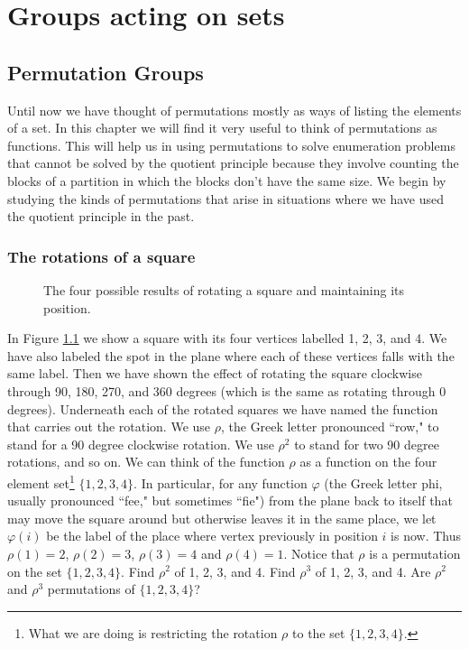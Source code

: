 \chapter{Groups acting on sets}

\label{groupsonsets}
\section{Permutation Groups}
Until now we have thought of permutations mostly as ways of listing the
elements of a set.  In this chapter we will find it very useful to think
of permutations as functions.  This will help us in using permutations to
solve enumeration problems that cannot be solved by the quotient
principle because they involve counting the blocks of a partition in
which the  blocks don't have the same size.  We begin by studying the
kinds of permutations that arise in situations where we have used the quotient
principle in the past.

\subsection{The rotations of a square}
\begin{figure}[htb]\caption{The four
possible results of rotating a square
and maintaining its position.}\label{RotationsOfSquare}\smallskip
\begin{center}\mbox{}
\end{center}  
\end{figure} 

In Figure \ref{RotationsOfSquare} we show a square with its four vertices
labelled 1, 2, 3, and 4.  We have also labeled the spot in the plane
where each of these vertices falls with the same label.  Then we have
shown the effect of rotating the square clockwise through 90, 180, 270, and 360
degrees (which is the same as rotating through 0 degrees).  Underneath
each of the rotated squares we have named the function that carries
out the rotation.  We use $\rho$, the Greek letter pronounced ``row," to
stand for a 90 degree clockwise rotation.  We use $\rho^2$ to stand for two 90
degree rotations, and so on.  We can think of the function $\rho$ as a
function on the four element set\footnote{What we are doing is
restricting the rotation $\rho$ to the set $\{1,2,3,4\}$.}
$\{1,2,3,4\}$.  In particular, for any function $\varphi$ (the Greek letter
phi, usually pronounced ``fee," but sometimes ``fie") from the plane back
to itself that may move the square around but otherwise leaves it in the
same place, we let $\varphi(i)$ be the label of the place where vertex 
previously in
position
$i$ is now.  Thus
$\rho(1) =2$, $\rho(2)=3$, $\rho(3)=4$ and $\rho(4) =1$.  Notice that
$\rho$ is a permutation on the set $\{1,2,3,4\}$.
\bp
\itemm Find $\rho^2$ of 1, 2, 3, and 4.  Find $\rho^3$ of 1, 2, 3, and 4.
Are $\rho^2$ and $\rho^3$ permutations of $\{1,2,3,4\}$?

